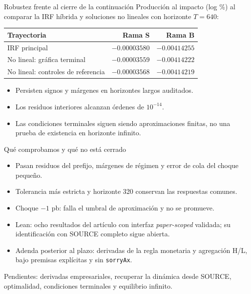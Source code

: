 \documentclass[aspectratio=169,11pt]{beamer}
\begin{document}
\begin{frame}{Robustez frente al cierre de la continuación}
\small
Producción al impacto (log \%) al comparar la IRF híbrida y soluciones
no lineales con horizonte $T=640$:
\medskip
\begin{center}
\begin{tabular}{lrr}
\toprule
Trayectoria & Rama S & Rama B\\
\midrule
IRF principal & $-0.00003580$ & $-0.00414255$\\
No lineal: gráfica terminal & $-0.00003559$ & $-0.00414222$\\
No lineal: controles de referencia & $-0.00003568$ & $-0.00414219$\\
\bottomrule
\end{tabular}
\end{center}
\begin{itemize}
\item Persisten signos y márgenes en horizontes largos auditados.
\item Los residuos interiores alcanzan órdenes de $10^{-14}$.
\item Las condiciones terminales siguen siendo aproximaciones finitas,
no una prueba de existencia en horizonte infinito.
\end{itemize}
\end{frame}

\begin{frame}{Qué comprobamos y qué no está cerrado}
\small
\begin{itemize}
\item Pasan residuos del prefijo, márgenes de régimen y error de cola del choque pequeño.
\item Tolerancia más estricta y horizonte 320 conservan las respuestas comunes.
\item Choque $-1$ pb: falla el umbral de aproximación y no se promueve.
\item Lean: ocho resultados del artículo con interfaz \emph{paper-scoped} validada; su identificación con SOURCE completo sigue abierta.
\item Adenda posterior al plazo: derivadas de la regla monetaria y agregación H/L, bajo premisas explícitas y sin \texttt{sorryAx}.
\end{itemize}
\medskip
Pendientes: derivadas empresariales, recuperar la dinámica desde SOURCE,
optimalidad, condiciones terminales y equilibrio infinito.
\end{frame}
\end{document}
